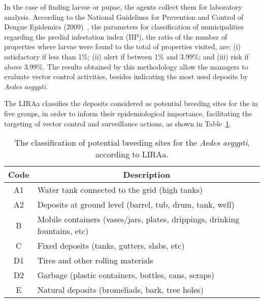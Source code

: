 In the case of finding larvae or pupae, the agents collect them for laboratory analysis.
According to the National Guidelines for Prevention and Control of Dengue Epidemics (2009)~\cite{brasil2009diretrizes}, the parameters for classification of municipalities regarding the predial infestation index (IIP), the ratio of the number of properties where larvae were found to the total of properties visited, are:
(i) satisfactory if less than 1\%; (ii) alert if between 1\% and 3.99\%; and (iii) risk if above 3.99\%.
The results obtained by this methodology allow the managers to evaluate vector control activities, besides indicating the most used deposits by \textit{Aedes aegypti}.

The LIRAa classifies the deposits considered as potential breeding sites for the \Aedes in five groups, in order to inform their epidemiological importance, facilitating the targeting of vector control and surveillance actions, as shown in Table~\ref{tab:deposits}.
%
%
\begin{table}[t!]
\caption{The classification of potential breeding sites for the {\it Aedes aegypti}, according to LIRAa.}
\label{tab:deposits}
\begin{tabular}{cl}
\toprule
\textbf{Code} & \multicolumn{1}{c}{\textbf{Description}}\\ \hline
A1 & Water tank connected to the grid (high tanks)\\
A2 & Deposits at ground level (barrel, tub, drum, tank, well) \\
B  & Mobile containers (vases/jars, plates, drippings, drinking fountains, etc) \\
C  & Fixed deposits (tanks, gutters, slabs, etc) \\
D1 & Tires and other rolling materials \\
D2 & Garbage (plastic containers, bottles, cans, scraps) \\
E  & Natural deposits (bromeliads, bark, tree holes) \\ \bottomrule
\end{tabular}
\end{table}
